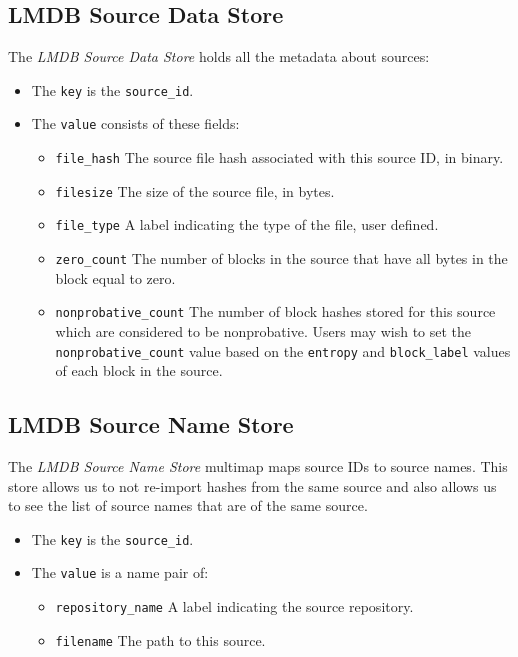 \documentclass[11pt,fleqn]{article} %
\begin{document}
\subsection{LMDB Source Data Store}
The \textit{LMDB Source Data Store} holds all the metadata about sources:
\begin{itemize}
\item The \verb+key+ is the \verb+source_id+.
\item The \verb+value+ consists of these fields:
  \begin{itemize}
  \item \verb+file_hash+ The source file hash associated with this source ID, in binary.
  \item \verb+filesize+ The size of the source file, in bytes.
  \item \verb+file_type+ A label indicating the type of the file, user defined.
  \item \verb+zero_count+ The number of blocks in the source that have all bytes in the block equal to zero.
  \item \verb+nonprobative_count+ The number of block hashes stored for this source which are considered to be nonprobative.  Users may wish to set the \verb+nonprobative_count+ value based on the \verb+entropy+ and \verb+block_label+ values of each block in the source.
  \end{itemize}
\end{itemize}

\subsection{LMDB Source Name Store}
The \textit{LMDB Source Name Store} multimap maps source IDs to source names.  This store allows us to not re-import hashes from the same source and also allows us to see the list of source names that are of the same source.
\begin{itemize}
\item The \verb+key+ is the \verb+source_id+.
\item The \verb+value+ is a name pair of:
  \begin{itemize}
  \item \verb+repository_name+ A label indicating the source repository.
  \item \verb+filename+ The path to this source.
  \end{itemize}
\end{itemize}

 

\end{document}
